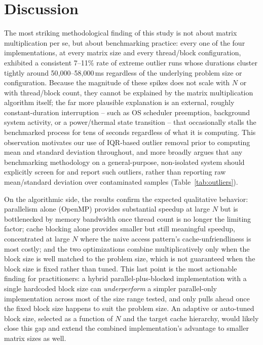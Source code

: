 \documentclass[11pt]{article}
\begin{document}
\section{Discussion}
\label{sec:discussion}

The most striking methodological finding of this study is not about matrix multiplication per se, but about benchmarking practice: every one of the four implementations, at every matrix size and every thread/block configuration, exhibited a consistent 7--11\% rate of extreme outlier runs whose durations cluster tightly around 50{,}000--58{,}000\,ms regardless of the underlying problem size or configuration. Because the magnitude of these spikes does not scale with $N$ or with thread/block count, they cannot be explained by the matrix multiplication algorithm itself; the far more plausible explanation is an external, roughly constant-duration interruption -- such as OS scheduler preemption, background system activity, or a power/thermal state transition -- that occasionally stalls the benchmarked process for tens of seconds regardless of what it is computing. This observation motivates our use of IQR-based outlier removal prior to computing mean and standard deviation throughout, and more broadly argues that any benchmarking methodology on a general-purpose, non-isolated system should explicitly screen for and report such outliers, rather than reporting raw mean/standard deviation over contaminated samples (Table~\ref{tab:outliers}).

On the algorithmic side, the results confirm the expected qualitative behavior: parallelism alone (OpenMP) provides substantial speedup at large $N$ but is bottlenecked by memory bandwidth once thread count is no longer the limiting factor; cache blocking alone provides smaller but still meaningful speedup, concentrated at large $N$ where the naive access pattern's cache-unfriendliness is most costly; and the two optimizations combine multiplicatively only when the block size is well matched to the problem size, which is not guaranteed when the block size is fixed rather than tuned. This last point is the most actionable finding for practitioners: a hybrid parallel-plus-blocked implementation with a single hardcoded block size can \emph{underperform} a simpler parallel-only implementation across most of the size range tested, and only pulls ahead once the fixed block size happens to suit the problem size. An adaptive or auto-tuned block size, selected as a function of $N$ and the target cache hierarchy, would likely close this gap and extend the combined implementation's advantage to smaller matrix sizes as well.
\end{document}
